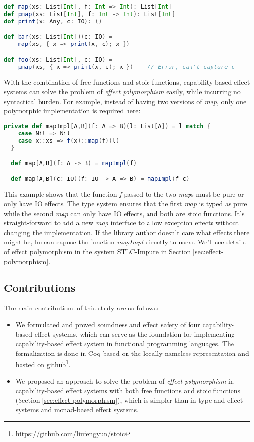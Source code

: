 \begin{lstlisting}[language=Scala]
def map(xs: List[Int], f: Int => Int): List[Int]
def pmap(xs: List[Int], f: Int -> Int): List[Int]
def print(x: Any, c: IO): ()

def bar(xs: List[Int])(c: IO) =
    map(xs, { x => print(x, c); x })

def foo(xs: List[Int], c: IO) =
    pmap(xs, { x => print(x, c); x })    // Error, can't capture c
\end{lstlisting}

With the combination of free functions and stoic functions,
capability-based effect systems can solve the problem of \emph{effect
  polymorphism} easily, while incurring no syntactical burden. For
example, instead of having two versions of \emph{map}, only one
polymorphic implementation is required here:

\begin{lstlisting}[language=Scala]
  private def mapImpl[A,B](f: A => B)(l: List[A]) = l match {
    case Nil => Nil
    case x::xs => f(x)::map(f)(l)
  }

  def map[A,B](f: A -> B) = mapImpl(f)

  def map[A,B](c: IO)(f: IO -> A => B) = mapImpl(f c)
\end{lstlisting}

This example shows that the function \emph{f} passed to the two
\emph{map}s must be pure or only have IO effects. The type system
ensures that the first \emph{map} is typed as pure while the second
\emph{map} can only have IO effects, and both are stoic
functions. It's straight-forward to add a new \emph{map} interface to
allow exception effects without changing the implementation. If the
library author doesn't care what effects there might be, he can expose
the function \emph{mapImpl} directly to users.  We'll see details of
effect polymorphism in the system STLC-Impure in Section
\ref{sec:effect-polymorphism}.

\subsection{Contributions}

The main contributions of this study are as follows:

\begin{itemize}
\item We formulated and proved soundness and effect safety of four
  capability-based effect systems, which can serve as the foundation
  for implementing capability-based effect system in functional
  programming languages. The formalization is done in Coq based on the
  locally-nameless representation\cite{chargueraud-11-ln} and hosted
  on github\footnote{\url{https://github.com/liufengyun/stoic}}.
\item We proposed an approach to solve the problem of \emph{effect
    polymorphism} in capability-based effect systems with both free
  functions and stoic functions (Section
  \ref{sec:effect-polymorphism}), which is simpler than in
  type-and-effect systems and monad-based effect systems.
\end{itemize}

